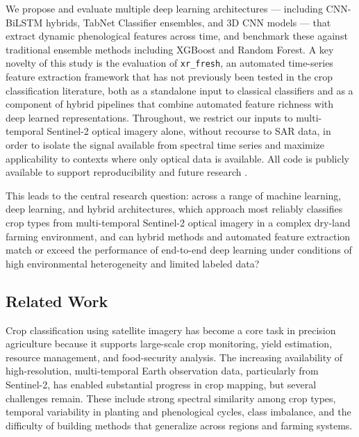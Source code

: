 \documentclass[pdflatex,sn-mathphys]{sn-jnl} %
\begin{document}
We propose and evaluate multiple deep learning architectures — including CNN-BiLSTM hybrids, TabNet Classifier ensembles, and 3D CNN models — that extract dynamic phenological features across time, and benchmark these against traditional ensemble methods including XGBoost and Random Forest. A key novelty of this study is the evaluation of \texttt{xr\_fresh}, an automated time-series feature extraction framework that has not previously been tested in the crop classification literature, both as a standalone input to classical classifiers and as a component of hybrid pipelines that combine automated feature richness with deep learned representations. Throughout, we restrict our inputs to multi-temporal Sentinel-2 optical imagery alone, without recourse to SAR data, in order to isolate the signal available from spectral time series and maximize applicability to contexts where only optical data is available. All code is publicly available to support reproducibility and future research \cite{capstone_repo}. 

This leads to the central research question: across a range of machine learning, deep learning, and hybrid architectures, which approach most reliably classifies crop types from multi-temporal Sentinel-2 optical imagery in a complex dry-land farming environment, and can hybrid methods and automated feature extraction match or exceed the performance of end-to-end deep learning under conditions of high environmental heterogeneity and limited labeled data?


\subsection{Related Work}

Crop classification using satellite imagery has become a core task in precision agriculture because it supports large-scale crop monitoring, yield estimation, resource management, and food-security analysis. The increasing availability of high-resolution, multi-temporal Earth observation data, particularly from Sentinel-2, has enabled substantial progress in crop mapping, but several challenges remain. These include strong spectral similarity among crop types, temporal variability in planting and phenological cycles, class imbalance, and the difficulty of building methods that generalize across regions and farming systems.
\end{document}
